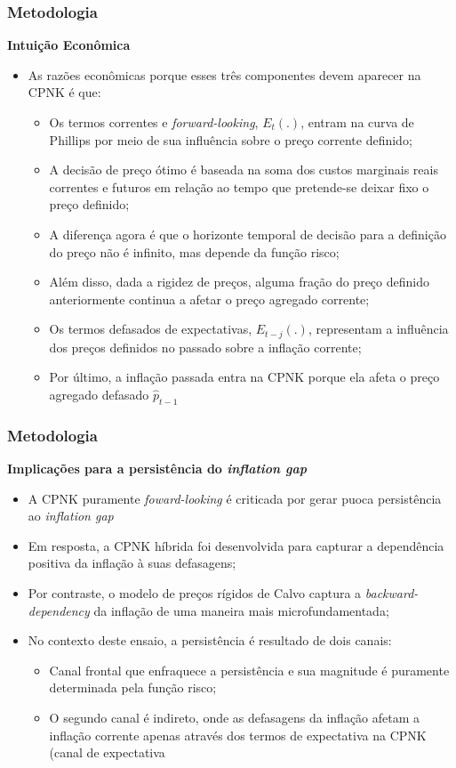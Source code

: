 \documentclass[aspectratio=169]{beamer}
\begin{document}
\begin{frame}\frametitle{Metodologia}
  \textbf{Intuição Econômica}
  \begin{itemize}
  \item As razões econômicas porque esses três componentes devem aparecer na CPNK é que:
    \begin{itemize}
    \item Os termos correntes e \emph{forward-looking}, ${E}_{t}(.)$, entram na curva de Phillips por meio de sua influência sobre o preço corrente definido;
    \item A decisão de preço ótimo é baseada na soma dos custos marginais reais correntes e futuros em relação ao tempo que pretende-se deixar fixo o preço definido;
    \item A diferença agora é que o horizonte temporal de decisão para a definição do preço não é infinito, mas depende da função risco;
    \item Além disso, dada a rigidez de preços, alguma fração do preço definido anteriormente continua a afetar o preço agregado corrente;
    \item Os termos defasados de expectativas, ${E}_{t-j}(.)$, representam a influência dos preços definidos no passado sobre a inflação corrente;
    \item Por último, a inflação passada entra na CPNK porque ela afeta o preço agregado defasado ${ \hat { p }  }_{ t-1 }$
    \end{itemize}
  \end{itemize}
\end{frame}

\begin{frame}\frametitle{Metodologia}
  \textbf{Implicações para a persistência do \emph{inflation gap}}
  \begin{itemize}
   \item A CPNK puramente \emph{foward-looking} é criticada por gerar puoca persistência ao \emph{inflation gap}
   \item Em resposta, a CPNK híbrida foi desenvolvida para capturar a dependência positiva da inflação à suas defasagens;
   \item Por contraste, o modelo de preços rígidos de Calvo captura a \emph{backward-dependency} da inflação de uma maneira mais microfundamentada;
   \item No contexto deste ensaio, a persistência é resultado de dois canais:
    \begin{itemize}
    \item Canal frontal que enfraquece a persistência e sua magnitude é puramente determinada pela função risco;
    \item O segundo canal é indireto, onde as defasagens da inflação afetam a inflação corrente apenas através dos termos de expectativa na CPNK (canal de expectativa
    \end{itemize}
  \end{itemize}
\end{frame}
\end{document}
